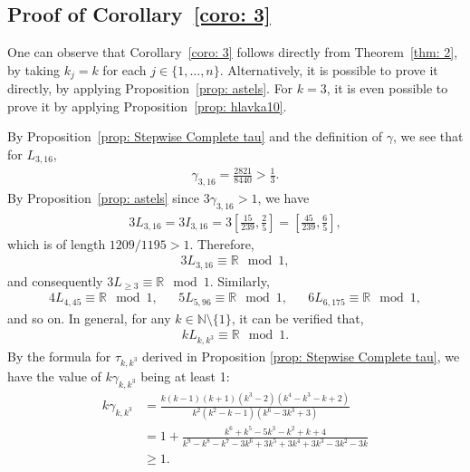\documentclass{ws-ijnt}
\begin{document}
	\subsection{Proof of Corollary~\ref{coro: 3}}\label{subsectproof2}
	
	One can observe that Corollary~\ref{coro: 3} follows directly from Theorem~\ref{thm: 2}, by taking $k_j=k$ for each $j\in\{1,\ldots,n\}$. Alternatively, it is possible to prove it directly, by applying Proposition~\ref{prop: astels}. For $k=3$, it is even possible to prove it by applying Proposition~\ref{prop: hlavka10}.
	
	By Proposition~\ref{prop: Stepwise Complete tau} and the definition of $\gamma$, we see that for $L_{3,16}$,
	\begin{align*}
		\gamma_{3,16}=\frac{2821}{8440}>\frac{1}{3}.
	\end{align*}
	By Proposition~\ref{prop: astels} since $3\gamma_{3,16}>1$, we have
	\begin{align*}
		3 L_{3,16}
		=3 I_{3,16}
		=3 \left[\frac{15}{239},\frac{2}{5}\right]
		=\left[\frac{45}{239},\frac{6}{5}\right],
	\end{align*}
	which is of length ${1209}/{1195}>1$. Therefore,
	\begin{align*}
		3 L_{3,16}\equiv\mathbb{R}\mod1,
	\end{align*}
	and consequently $3 L_{\geq3}\equiv\mathbb{R}\mod1$. Similarly,
	\begin{align*}
		4 L_{4,45}\equiv\mathbb{R}\mod1, &&
		5 L_{5,96}\equiv\mathbb{R}\mod1, &&
		6 L_{6,175}\equiv\mathbb{R}\mod1, 
	\end{align*}
	and so on. In general, for any $k\in\mathbb{N}\setminus\{1\}$, it can be verified that,
	\begin{align*}
		k L_{k,k^3}\equiv\mathbb{R}\mod1.
	\end{align*}
	By the formula for $\tau_{k,k^3}$ derived in Proposition \ref{prop: Stepwise Complete tau}, we have the value of $k\gamma_{k,k^3}$ being at least 1:
	\begin{align*}
		k\gamma_{k,k^3}
		&=\frac{k(k-1)(k+1)(k^3-2)(k^4-k^3-k+2)}{k^2(k^2-k-1)(k^6-3k^3+3)} \\
		&=1+\frac{k^6+k^5-5k^3-k^2+k+4}{k^9-k^8-k^7-3 k^6+3k^5+3k^4+3k^3-3 k^2-3k} \\
		&\geq 1.
	\end{align*}
	
\end{document}
